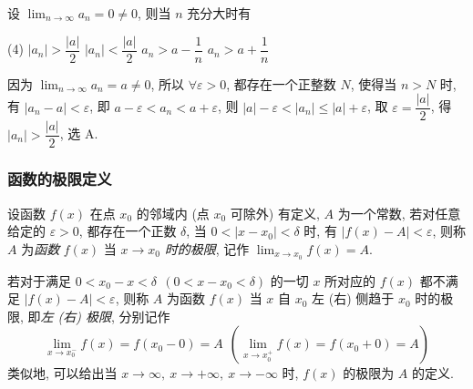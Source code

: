 \begin{example}[2014 数三]
    设 $\displaystyle\lim_{n\to\infty}a_n=0\neq 0$, 则当 $n$ 充分大时有
    \begin{tasks}(4)
        \task $|a_n|>\dfrac{|a|}{2}$
        \task $|a_n|<\dfrac{|a|}{2}$
        \task $a_n>a-\dfrac{1}{n}$
        \task $a_n>a+\dfrac{1}{n}$
    \end{tasks}
\end{example}
\begin{solution}
    因为 $\displaystyle\lim_{n\to\infty}a_n=a\neq 0$, 所以 $\forall\varepsilon>0$, 都存在一个正整数 $N$, 使得当 $n>N$ 时, 有 $|a_n-a|<\varepsilon$,
    即 $a-\varepsilon<a_n<a+\varepsilon$, 则 $|a|-\varepsilon<|a_n|\leqslant |a|+\varepsilon$, 取 $\varepsilon=\dfrac{|a|}{2}$, 得 $|a_n|>\dfrac{|a|}{2}$, 选 A.
\end{solution}

\subsubsection{函数的极限定义}

\begin{definition}[函数的极限]
    设函数 $f(x)$ 在点 $x_0$ 的邻域内 (点 $x_0$ 可除外) 有定义, $A$ 为一个常数, 若对任意给定的 $\varepsilon>0$, 都存在一个正数 $\delta$,
    当 $0<|x-x_0|<\delta$ 时, 有 $|f(x)-A|<\varepsilon$, 则称 $A$ 为\textit{函数} $f(x)$ 当 $x\to x_0$ \textit{时的极限}, 记作 $\displaystyle\lim_{x\to x_0}f(x)=A.$
\end{definition}

\begin{definition}[左右极限]
    若对于满足 $0<x_0-x<\delta~~(0<x-x_0<\delta)$ 的一切 $x$ 所对应的 $f(x)$ 都不满足 $|f(x)-A|<\varepsilon$, 则称 $A$ 为函数 $f(x)$ 当 $x$ 自 $x_0$ 左 (右) 侧趋于 $x_0$ 时的极限, 即\textit{左 (右) 极限},
    分别记作 $$\lim_{x\to x_0^-}f(x)=f(x_0-0)=A~~(\lim_{x\to x_0^+}f(x)=f(x_0+0)=A)$$
    类似地, 可以给出当 $x\to\infty,~x\to+\infty,~x\to-\infty$ 时, $f(x)$ 的极限为 $A$ 的定义.
\end{definition}


